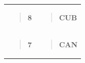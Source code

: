 \documentclass[12pt,a4paper]{article}
\renewenvironment{quote}{\begin{quotation}}{\end{quotation}}  %
\begin{document}
    \begin{longtable}[]{@{}
      >{\raggedright\arraybackslash}p{}
      >{\raggedright\arraybackslash}p{}@{}}
    \toprule\noalign{}
    \endhead
    \bottomrule\noalign{}
    \endlastfoot
    \begin{minipage}[t]{\linewidth}\raggedright
    \begin{quote}
    \textbf{8}
    \end{quote}
    \end{minipage} & \begin{minipage}[t]{\linewidth}\raggedright
    \begin{quote}
    \textbf{CUB}
    \end{quote}
    \end{minipage} \\
    \begin{minipage}[t]{\linewidth}\raggedright
    \begin{quote}
    \textbf{7}
    \end{quote}
    \end{minipage} & \begin{minipage}[t]{\linewidth}\raggedright
    \begin{quote}
    \textbf{CAN}
    \end{quote}
    \end{minipage} \\
    \end{longtable}
    
\end{document}
